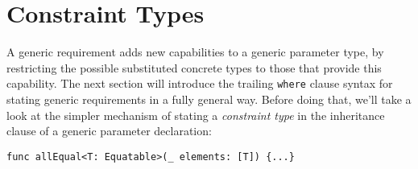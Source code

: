 \documentclass[a4paper,headsepline,bibliography=totoc,toc=flat,fleqn,twoside=semi]{scrbook}
\theoremstyle{definition}
\theoremstyle{definition}
\theoremstyle{definition}
\begin{document}
\section{Constraint Types}\label{constraints}

A generic requirement adds new capabilities to a generic parameter type, by restricting the possible substituted concrete types to those that provide this capability. The next section will introduce the trailing \texttt{where} clause syntax for stating generic requirements in a fully general way. Before doing that, we'll take a look at the simpler mechanism of stating a \emph{constraint type} in the inheritance clause of a generic parameter declaration:
\begin{Verbatim}
func allEqual<T: Equatable>(_ elements: [T]) {...}
\end{Verbatim}
\end{document}
